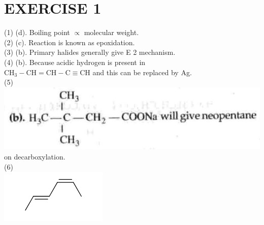 \documentclass[10pt]{article}
\begin{document}
\section*{EXERCISE 1}
(1) (d). Boiling point $\propto$ molecular weight.\\
(2) (c). Reaction is known as epoxidation.\\
(3) (b). Primary halides generally give E 2 mechanism.\\
(4) (b). Because acidic hydrogen is present in\\
$\mathrm{CH}_{3}-\mathrm{CH}=\mathrm{CH}-\mathrm{C} \equiv \mathrm{CH}$ and this can be replaced by Ag.\\
(5)\\
\includegraphics[max width=\textwidth, center]{2025_01_28_8470952b98110cec3aabg-241(1)}\\
on decarboxylation.\\
(6)\\
\includegraphics{smile-7fcc4de115de68523ae4d1437e12fb114e79fb98}
\end{document}

